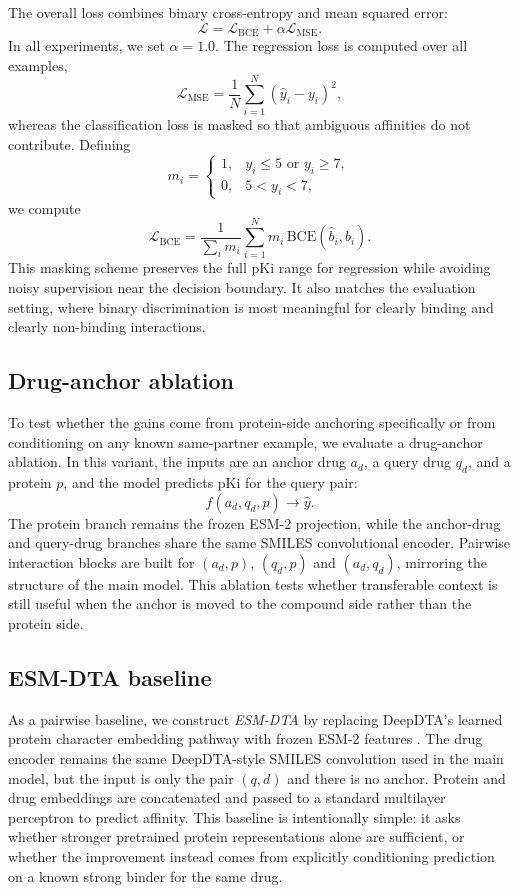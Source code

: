 The overall loss combines binary cross-entropy and mean squared error:
\[
\mathcal{L} = \mathcal{L}_{\mathrm{BCE}} + \alpha \mathcal{L}_{\mathrm{MSE}}.
\]
In all experiments, we set $\alpha=1.0$.
The regression loss is computed over all examples,
\[
\mathcal{L}_{\mathrm{MSE}} = \frac{1}{N}\sum_{i=1}^{N}(\hat{y}_i-y_i)^2,
\]
whereas the classification loss is masked so that ambiguous affinities do not contribute. Defining
\[
m_i=
\begin{cases}
1, & y_i\leq 5 \text{ or } y_i\geq 7, \\
0, & 5<y_i<7,
\end{cases}
\]
we compute
\[
\mathcal{L}_{\mathrm{BCE}} =
\frac{1}{\sum_i m_i}
\sum_{i=1}^{N}
m_i\,\mathrm{BCE}(\hat{b}_i,b_i).
\]
This masking scheme preserves the full pKi range for regression while avoiding noisy supervision near the decision boundary. It also matches the evaluation setting, where binary discrimination is most meaningful for clearly binding and clearly non-binding interactions.

\subsection{Drug-anchor ablation}

To test whether the gains come from protein-side anchoring specifically or from conditioning on any known same-partner example, we evaluate a drug-anchor ablation. In this variant, the inputs are an anchor drug $a_d$, a query drug $q_d$, and a protein $p$, and the model predicts pKi for the query pair:
\[
f(a_d,q_d,p)\rightarrow \hat{y}.
\]
The protein branch remains the frozen ESM-2 projection, while the anchor-drug and query-drug branches share the same SMILES convolutional encoder. Pairwise interaction blocks are built for $(a_d,p)$, $(q_d,p)$ and $(a_d,q_d)$, mirroring the structure of the main model. This ablation tests whether transferable context is still useful when the anchor is moved to the compound side rather than the protein side.

\subsection{ESM-DTA baseline}

As a pairwise baseline, we construct \emph{ESM-DTA} by replacing DeepDTA's learned protein character embedding pathway with frozen ESM-2 features \cite{lin2023esm2}. The drug encoder remains the same DeepDTA-style SMILES convolution used in the main model, but the input is only the pair $(q,d)$ and there is no anchor. Protein and drug embeddings are concatenated and passed to a standard multilayer perceptron to predict affinity. This baseline is intentionally simple: it asks whether stronger pretrained protein representations alone are sufficient, or whether the improvement instead comes from explicitly conditioning prediction on a known strong binder for the same drug.

